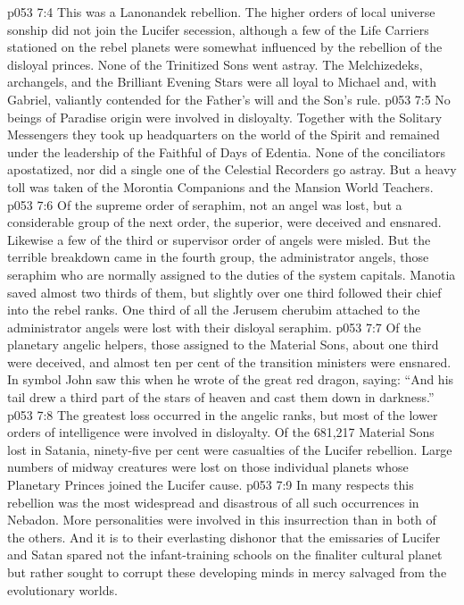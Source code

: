 \vs p053 7:4 This was a Lanonandek rebellion. The higher orders of local universe sonship did not join the Lucifer secession, although a few of the Life Carriers stationed on the rebel planets were somewhat influenced by the rebellion of the disloyal princes. None of the Trinitized Sons went astray. The Melchizedeks, archangels, and the Brilliant Evening Stars were all loyal to Michael and, with Gabriel, valiantly contended for the Father’s will and the Son’s rule.\plusone
\vs p053 7:5 No beings of Paradise origin were involved in disloyalty. Together with the Solitary Messengers they took up headquarters on the world of the Spirit and remained under the leadership of the Faithful of Days of Edentia. None of the conciliators apostatized, nor did a single one of the Celestial Recorders go astray. But a heavy toll was taken of the Morontia Companions and the Mansion World Teachers.
\vs p053 7:6 Of the supreme order of seraphim, not an angel was lost, but a considerable group of the next order, the superior, were deceived and ensnared. Likewise a few of the third or supervisor order of angels were misled. But the terrible breakdown came in the fourth group, the administrator angels, those seraphim who are normally assigned to the duties of the system capitals. Manotia saved almost two thirds of them, but slightly over one third followed their chief into the rebel ranks. One third of all the Jerusem cherubim attached to the administrator angels were lost with their disloyal seraphim.
\vs p053 7:7 Of the planetary angelic helpers, those assigned to the Material Sons, about one third were deceived, and almost ten per cent of the transition ministers were ensnared. In symbol John saw this when he wrote of the great red dragon, saying: “And his tail drew a third part of the stars of heaven and cast them down in darkness.”
\vs p053 7:8 The greatest loss occurred in the angelic ranks, but most of the lower orders of intelligence were involved in disloyalty. Of the 681,217 Material Sons lost in Satania, ninety\hyp{}five per cent were casualties of the Lucifer rebellion. Large numbers of midway creatures were lost on those individual planets whose Planetary Princes joined the Lucifer cause.
\pc \vs p053 7:9 In many respects this rebellion was the most widespread and disastrous of all such occurrences in Nebadon. More personalities were involved in this insurrection than in both of the others. And it is to their everlasting dishonor that the emissaries of Lucifer and Satan spared not the infant\hyp{}training schools on the finaliter cultural planet but rather sought to corrupt these developing minds in mercy salvaged from the evolutionary worlds.
